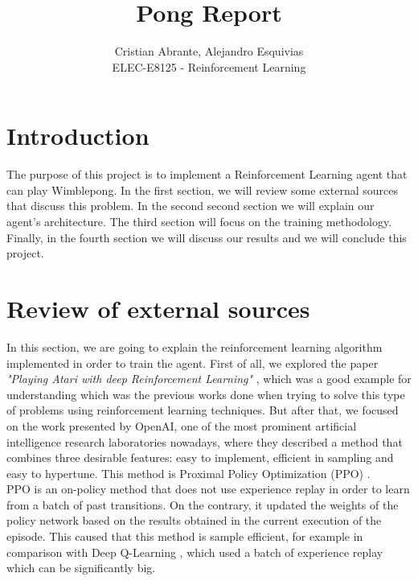 \documentclass[12pt]{article}
\begin{document}
 
\title{Pong Report}
\author{Cristian Abrante, Alejandro Esquivias\\

ELEC-E8125 - Reinforcement Learning}

\maketitle
\section{Introduction}
The purpose of this project is to implement a Reinforcement Learning agent that can play Wimblepong. In the first section, we will review some external sources that discuss this problem. In the second second section we will explain our agent's architecture. The third section will focus on the training methodology. Finally, in the fourth section we will discuss our results and we will conclude this project.

\section{Review of external sources}

In this section, we are going to explain the reinforcement learning algorithm implemented in order to train the agent. First of all, we explored the paper \textit{"Playing Atari with deep Reinforcement Learning"} \cite{mnih2013playing}, which was a good example for understanding which was the previous works done when trying to solve this type of problems using reinforcement learning techniques. But after that, we focused on the work presented by OpenAI, one of the most prominent artificial intelligence research laboratories nowadays, where they described a method that combines three desirable features: easy to implement, efficient in sampling and easy to hypertune. This method is Proximal Policy Optimization (PPO) \cite{schulman2017proximal}. \\

PPO is an on-policy method that does not use experience replay in order to learn from a batch of past transitions. On the contrary, it updated the weights of the policy network based on the results obtained in the current execution of the episode. This caused that this method is sample efficient, for example in comparison with Deep Q-Learning \cite{gu2016continuous}, which used a batch of experience replay which can be significantly big.\\
\end{document}
